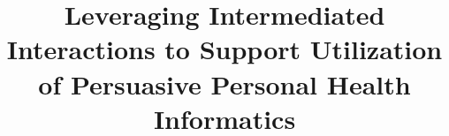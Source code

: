 \documentclass{sig-alternate}
\begin{document}
%

\title{Leveraging Intermediated Interactions to Support Utilization of Persuasive Personal Health Informatics}
%
%
%
%
%
\end{document}
